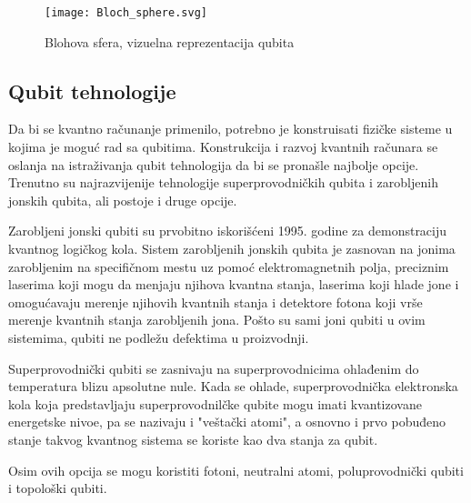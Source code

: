 \documentclass[fleqn, 12pt]{article}
\begin{document}
\begin{figure}[h!]
    \centering
    \texttt{[image: Bloch\_sphere.svg]}
    \caption{Blohova sfera, vizuelna reprezentacija qubita}
\end{figure}

\newpage

\subsection{Qubit tehnologije}

\begin{text}
Da bi se kvantno računanje primenilo, potrebno je konstruisati fizičke sisteme u kojima je moguć rad sa qubitima. Konstrukcija i razvoj kvantnih računara se oslanja na istraživanja qubit tehnologija da bi se pronašle najbolje opcije. Trenutno su najrazvijenije tehnologije superprovodničkih qubita i zarobljenih jonskih qubita, ali postoje i druge opcije. \cite{G1}

Zarobljeni jonski qubiti su prvobitno iskorišćeni 1995. godine za demonstraciju kvantnog logičkog kola. \cite{G1} Sistem zarobljenih jonskih qubita je zasnovan na jonima zarobljenim na specifičnom mestu uz pomoć elektromagnetnih polja, preciznim laserima koji mogu da menjaju njihova kvantna stanja, laserima koji hlade jone i omogućavaju merenje njihovih kvantnih stanja i detektore fotona koji vrše merenje kvantnih stanja zarobljenih jona. \cite{G1} Pošto su sami joni qubiti u ovim sistemima, qubiti ne podležu defektima u proizvodnji. \cite{G1}

Superprovodnički qubiti se zasnivaju na superprovodnicima ohlađenim do temperatura blizu apsolutne nule. Kada se ohlade, superprovodnička elektronska kola koja predstavljaju superprovodnilčke qubite mogu imati kvantizovane energetske nivoe, pa se nazivaju i "veštački atomi", a osnovno i prvo pobuđeno stanje takvog kvantnog sistema se koriste kao dva stanja za qubit. \cite{G1}

Osim ovih opcija se mogu koristiti fotoni, neutralni atomi, poluprovodnički qubiti i topološki qubiti. \cite{G1}
\end{text}
\end{document}
